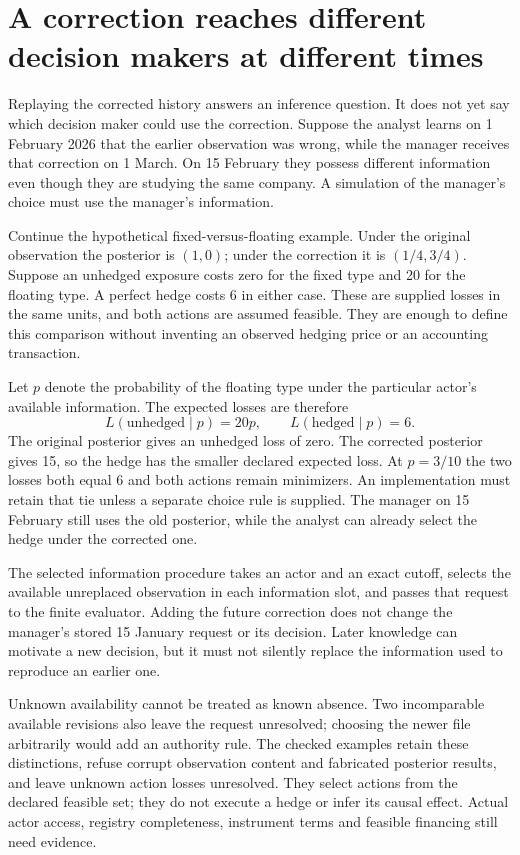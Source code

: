 
\section{A correction reaches different decision makers at different times}
\label{sim:actor-vintage-decision}
Replaying the corrected history answers an inference question. It does not
yet say which decision maker could use the correction. Suppose the analyst
learns on 1 February 2026 that the earlier observation was wrong, while the
manager receives that correction on 1 March. On 15 February they possess
different information even though they are studying the same company. A
simulation of the manager's choice must use the manager's information.

Continue the hypothetical fixed-versus-floating example. Under the original
observation the posterior is $(1,0)$; under the correction it is
$(1/4,3/4)$. Suppose an unhedged exposure costs zero for the fixed type and
20 for the floating type. A perfect hedge costs 6 in either case. These are
supplied losses in the same units, and both actions are assumed feasible.
They are enough to define this comparison without inventing an observed
hedging price or an accounting transaction.

Let $p$ denote the probability of the floating type under the particular
actor's available information. The expected losses are therefore
\begin{equation}
  L(\text{unhedged}\mid p)=20p,\qquad
  L(\text{hedged}\mid p)=6.
  \label{sim:actor-hedge-loss}
\end{equation}
The original posterior gives an unhedged loss of zero. The corrected
posterior gives 15, so the hedge has the smaller declared expected loss.
At $p=3/10$ the two losses both equal 6 and both actions remain minimizers.
An implementation must retain that tie unless a separate choice rule is
supplied. The manager on 15 February still uses the old posterior, while
the analyst can already select the hedge under the corrected one.

The selected information procedure takes an actor and an exact cutoff,
selects the available unreplaced observation in each information slot, and
passes that request to the finite evaluator. Adding the future correction
does not change the manager's stored 15 January request or its decision.
Later knowledge can motivate a new decision, but it must not silently
replace the information used to reproduce an earlier one.

Unknown availability cannot be treated as known absence. Two incomparable
available revisions also leave the request unresolved; choosing the newer
file arbitrarily would add an authority rule. The checked examples retain
these distinctions, refuse corrupt observation content and fabricated
posterior results, and leave unknown action losses unresolved. They select
actions from the declared feasible set; they do not execute a hedge or infer
its causal effect. Actual actor access, registry completeness, instrument
terms and feasible financing still need evidence.
